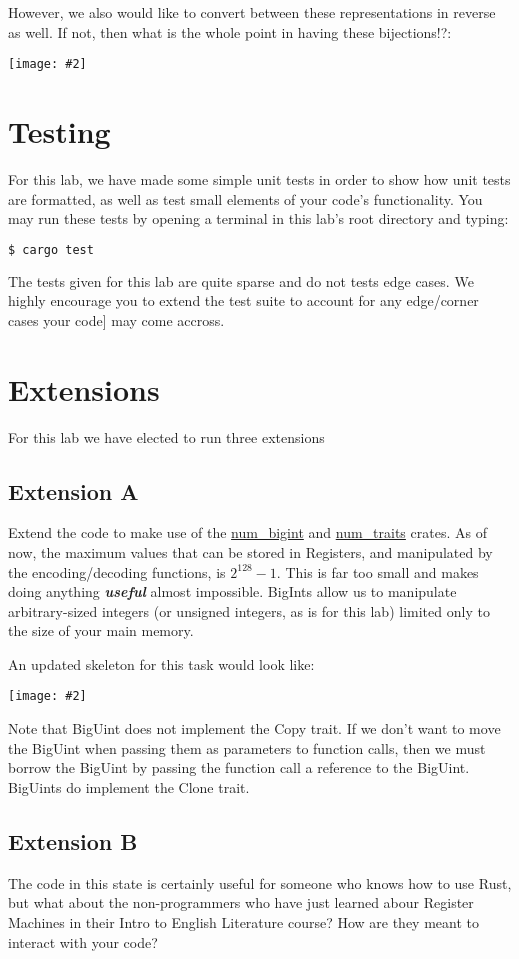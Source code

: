 \documentclass{report}
\newcommand{\centerimg}[2]{\begin{center}\texttt{[image: \#2]}\end{center}}
\begin{document}
However, we also would like to convert between these representations in
reverse as well. If not, then what is the whole point in having these bijections!?:
\centerimg{width=\textwidth}{Decodes}

\section*{Testing}
For this lab, we have made some simple unit tests in order to show how unit tests
are formatted, as well as test small elements of your code's functionality.
You may run these tests by opening a terminal in this lab's root directory and typing:
\begin{lstlisting}[language=Bash]
$ cargo test
\end{lstlisting}

The tests given for this lab are quite sparse and do not tests edge cases. We highly
encourage you to extend the test suite to account for any edge/corner cases your code]
may come accross.

\section*{Extensions}

For this lab we have elected to run three extensions
\subsection*{Extension A} 
Extend the code to make use of the \href{https://docs.rs/num-bigint/latest/num_bigint}{num\_bigint} and 
\href{https://docs.rs/num-traits/latest/num_traits}{num\_traits} crates.
As of now, the maximum values that can be stored in Registers, and manipulated by
the encoding/decoding functions, is $2^{128}-1$. This is far too small and makes doing anything
\textbf{\textit{useful}} almost impossible. BigInts allow us to manipulate arbitrary-sized
integers (or unsigned integers, as is for this lab) limited only to the size of your
main memory.

An updated skeleton for this task would look like:
\centerimg{width=\textwidth}{BigUInt}
Note that BigUint does not implement the Copy trait. If we don't want to move the BigUint when
passing them as parameters to function calls, then we must borrow the BigUint by passing
the function call a reference to the BigUint. BigUints do implement the Clone trait.

\subsection*{Extension B}
The code in this state is certainly useful for someone who knows how to use Rust,
but what about the non-programmers who have just learned abour Register Machines in
their Intro to English Literature course? How are they meant to interact with your 
code?
\end{document}
